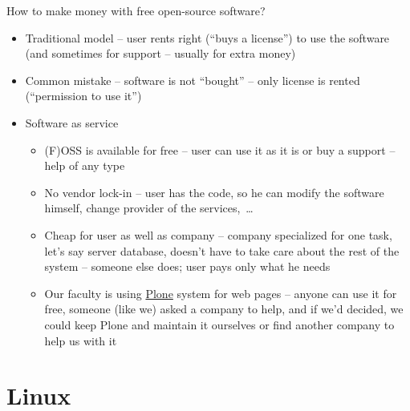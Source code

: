\documentclass[compress, ucs, xelatex, 11pt, xcolor=svgnames,
  hyperref={
    bookmarks=true,
    unicode=true,
    colorlinks=true,
    pdftitle={Linux, command line and MetaCentrum},
    plainpages=false,
    pdfauthor={Vojtech Zeisek},
    pdfsubject={Course about use of Linux command line, writing shell scripts and using MetaCentrum of CESNET},
    pdfcreator={XeLaTeX},
    pdfkeywords={Linux, GNU, BASH, shell, command line, MetaCentrum},
    linkcolor=DarkRed,
    anchorcolor=DarkBlue,
    citecolor=Indigo,
    filecolor=NavyBlue,
    menucolor=DarkMagenta,
    urlcolor=DarkBlue,
    pdftex},
  url={hyphens, lowtilde} %
  ]{beamer}
\begin{document}
\begin{frame}{How to make money with free open-source software?}
  \begin{itemize}
    \item Traditional model -- user rents right (``buys a license'') to use the software (and sometimes for support -- usually for extra money)
    \item Common mistake -- software is not ``bought'' -- only license is rented (``permission to use it'')
    \item Software as service
    \begin{itemize}
      \item (F)OSS is available for free -- user can use it as it is or buy a support -- help of any type
      \item No vendor lock-in -- user has the code, so he can modify the software himself, change provider of the services,~\ldots
      \item Cheap for user as well as company -- company specialized for one task, let's say server database, doesn't have to take care about the rest of the system -- someone else does; user pays only what he needs
      \item Our faculty is using \href{https://plone.org/}{Plone} system for web pages -- anyone can use it for free, someone (like we) asked a company to help, and if we'd decided, we  could keep Plone and maintain it ourselves or find another company to help us with it
    \end{itemize}
  \end{itemize}
\end{frame}

\section{Linux}
\end{document}
